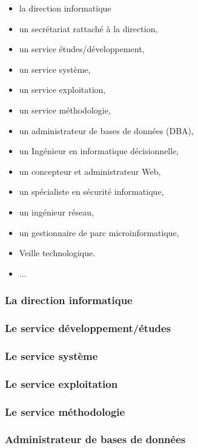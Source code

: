 \documentclass[10pt,a4paper,oneside,titlepage]{report}
\begin{document}
\begin{sffamily}
\begin{itemize}
\item la direction informatique
\item un secrétariat rattaché à la direction,
\item un service études/développement,
\item un service système,
\item un service exploitation,
\item un service méthodologie,
\item un administrateur de bases de données (DBA),
\item un Ingénieur en informatique décisionnelle,
\item un concepteur et administrateur Web,
\item un spécialiste en sécurité informatique,
\item un ingénieur réseau,
\item un gestionnaire de parc microinformatique,
\item Veille technologique.
\item ...
\end{itemize}

\subsubsection{La direction informatique}

\subsubsection{Le service développement/études}

\subsubsection{Le service système}

\subsubsection{Le service exploitation}

\subsubsection{Le service méthodologie}

\subsubsection{Administrateur de bases de données}


\end{sffamily}
\end{document}

